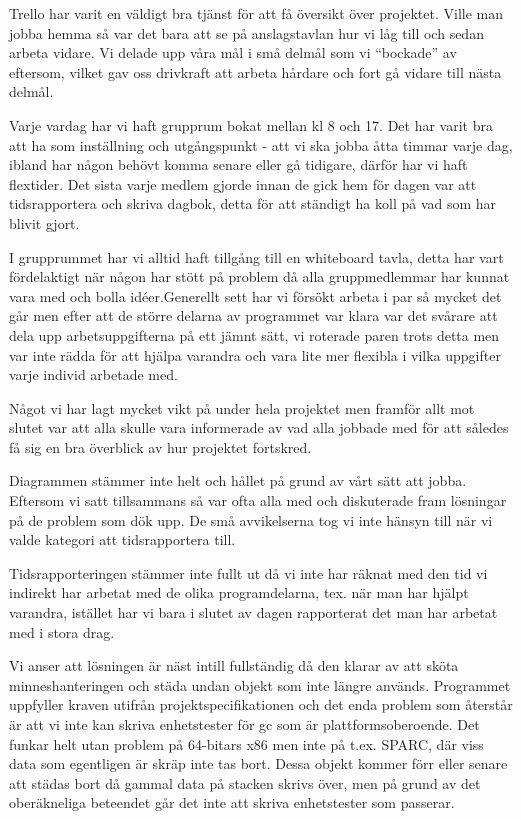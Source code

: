 Trello har varit en väldigt bra tjänst för att få översikt över projektet. Ville man jobba hemma så var det bara att se på anslagstavlan hur vi låg till och sedan arbeta vidare. Vi delade upp våra mål i små delmål som vi “bockade” av eftersom, vilket gav oss drivkraft att arbeta hårdare och fort gå vidare till nästa delmål.


Varje vardag har vi haft grupprum bokat mellan kl 8 och 17. Det har varit bra att ha som inställning och utgångspunkt - att vi ska jobba åtta timmar varje dag, ibland har någon behövt komma senare eller gå tidigare, därför har vi haft flextider. Det sista varje medlem gjorde innan de gick hem för dagen var att tidsrapportera och skriva dagbok, detta för att ständigt ha koll på vad som har blivit gjort.

I grupprummet har vi alltid haft tillgång till en whiteboard tavla, detta har vart fördelaktigt när någon har stött på problem då alla gruppmedlemmar har kunnat vara med och bolla idéer.Generellt sett har vi försökt arbeta i par så mycket det går men efter att de större delarna av programmet var klara var det svårare att dela upp arbetsuppgifterna på ett jämnt sätt, vi roterade paren trots detta men var inte rädda för att hjälpa varandra och vara lite mer flexibla i vilka uppgifter varje individ arbetade med. 

Något vi har lagt mycket vikt på under hela projektet men framför allt mot slutet var att alla skulle vara informerade av vad alla jobbade med för att således få sig en bra överblick av hur projektet fortskred. 

Diagrammen stämmer inte helt och hållet på grund av vårt sätt att jobba. Eftersom vi satt tillsammans så var ofta alla med och diskuterade fram lösningar på de problem som dök upp. De små avvikelserna tog vi inte hänsyn till när vi valde kategori att tidsrapportera till.

Tidsrapporteringen stämmer inte fullt ut då vi inte har räknat med den tid vi indirekt har arbetat med de olika programdelarna, tex. när man har hjälpt varandra, istället har vi bara i slutet av dagen rapporterat det man har arbetat med i stora drag.

Vi anser att lösningen är näst intill fullständig då den klarar av att sköta minneshanteringen och städa undan objekt som inte längre används.  Programmet uppfyller kraven utifrån projektspecifikationen och det enda problem som återstår är att vi inte kan skriva enhetstester för gc som är plattformsoberoende. Det funkar helt utan problem på 64-bitars x86 men inte på t.ex. SPARC, där viss data som egentligen är skräp inte tas bort. Dessa objekt kommer förr eller senare att städas bort då gammal data på stacken skrivs över, men på grund av det oberäkneliga beteendet går det inte att skriva enhetstester som passerar.

